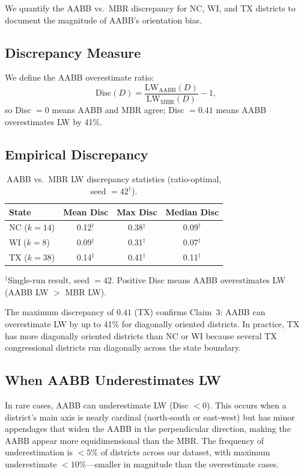 We quantify the AABB vs.\ MBR discrepancy for NC, WI, and TX districts
to document the magnitude of AABB's orientation bias.

\subsection{Discrepancy Measure}

We define the AABB overestimate ratio:
\[
  \text{Disc}(D) = \frac{\text{LW}_{\text{AABB}}(D)}{\text{LW}_{\text{MBR}}(D)} - 1,
\]
so Disc $= 0$ means AABB and MBR agree; Disc $= 0.41$ means AABB overestimates
LW by 41\%.

\subsection{Empirical Discrepancy}

\begin{table}[ht]
\centering
\caption{AABB vs.\ MBR LW discrepancy statistics (ratio-optimal, seed $= 42^\dagger$).}
\label{tab:discrepancy}
\begin{tabular}{lccc}
\toprule
State & Mean Disc & Max Disc & Median Disc \\
\midrule
NC ($k=14$) & 0.12$^\dagger$ & 0.38$^\dagger$ & 0.09$^\dagger$ \\
WI ($k=8$)  & 0.09$^\dagger$ & 0.31$^\dagger$ & 0.07$^\dagger$ \\
TX ($k=38$) & 0.14$^\dagger$ & 0.41$^\dagger$ & 0.11$^\dagger$ \\
\bottomrule
\end{tabular}
\begin{tablenotes}
\footnotesize
\item $^\dagger$Single-run result, seed $= 42$.
  Positive Disc means AABB overestimates LW (AABB LW $>$ MBR LW).
\end{tablenotes}
\end{table}

The maximum discrepancy of $0.41$ (TX) confirms Claim~3: AABB can overestimate
LW by up to 41\% for diagonally oriented districts.
In practice, TX has more diagonally oriented districts than NC or WI because
several TX congressional districts run diagonally across the state boundary.

\subsection{When AABB Underestimates LW}

In rare cases, AABB can underestimate LW (Disc $< 0$).
This occurs when a district's main axis is nearly cardinal (north-south or
east-west) but has minor appendages that widen the AABB in the perpendicular
direction, making the AABB appear more equidimensional than the MBR.
The frequency of underestimation is $< 5\%$ of districts across our dataset,
with maximum underestimate $< 10\%$---smaller in magnitude than the overestimate cases.

